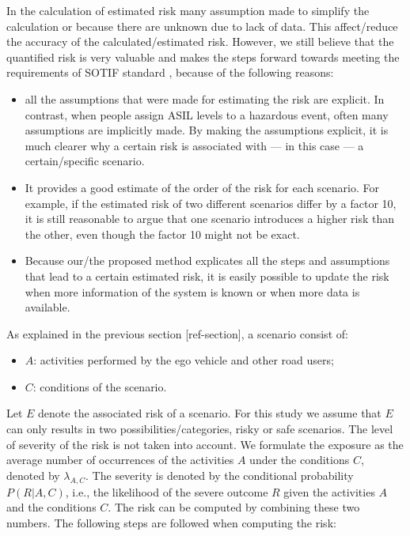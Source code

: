 \color{red}
In the calculation of estimated risk many assumption made to simplify the calculation or because there are unknown due to lack of data. This affect/reduce the accuracy of the calculated/estimated risk. 
However, we still believe that the quantified risk is very valuable and makes the steps forward towards meeting the requirements of SOTIF standard , because of the following reasons:
\begin{itemize}
	\item all the assumptions that were made for estimating the risk are explicit. In contrast, when people assign ASIL levels to a hazardous event, often many assumptions are implicitly made. By making the assumptions explicit, it is much clearer why a certain risk is associated with --- in this case --- a certain/specific scenario.
	\item It provides a good estimate of the order of the risk for each scenario. For example, if the estimated risk of two different scenarios differ by a factor 10, it is still reasonable to argue that one scenario introduces a higher risk than the other, even though the factor 10 might not be exact.
	\item Because our/the proposed method explicates all the steps and assumptions that lead to a certain estimated risk, it is easily possible to update the risk when more information of the system is known or when more data is available.
\end{itemize}
\color{black}
As explained in the previous section [ref-section], a scenario consist of:
\begin{itemize}
	\item $A$: activities performed by the ego vehicle and other road users;
	\item $C$: conditions of the scenario.
\end{itemize}
Let $E$ denote the associated risk of a scenario. For this study we assume that $E$ can only results in two possibilities/categories, risky or safe scenarios. The level of severity of the risk is not taken into account. We formulate the exposure as the average number of occurrences of the activities $A$ under the conditions $C$, denoted by $\lambda_{A,C}$. The severity is denoted by the conditional probability $P(R|A,C)$, i.e., the likelihood of the severe outcome $R$ given the activities $A$ and the conditions $C$. The risk can be computed by combining these two numbers. The following steps are followed when computing the risk:
